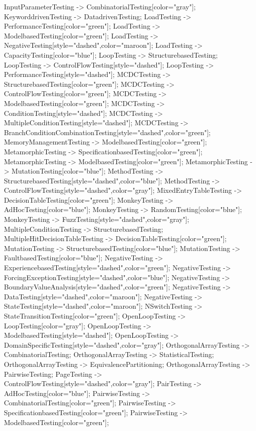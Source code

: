 \documentclass{article}
\begin{document}
{InputParameterTesting -> CombinatorialTesting[color="gray"];
KeyworddrivenTesting -> DatadrivenTesting;
LoadTesting -> PerformanceTesting[color="green"];
LoadTesting -> ModelbasedTesting[color="green"];
LoadTesting -> NegativeTesting[style="dashed",color="maroon"];
LoadTesting -> CapacityTesting[color="blue"];
LoopTesting -> StructurebasedTesting;
LoopTesting -> ControlFlowTesting[style="dashed"];
LoopTesting -> PerformanceTesting[style="dashed"];
MCDCTesting -> StructurebasedTesting[color="green"];
MCDCTesting -> ControlFlowTesting[color="green"];
MCDCTesting -> ModelbasedTesting[color="green"];
MCDCTesting -> ConditionTesting[style="dashed"];
MCDCTesting -> MultipleConditionTesting[style="dashed"];
MCDCTesting -> BranchConditionCombinationTesting[style="dashed",color="green"];
MemoryManagementTesting -> ModelbasedTesting[color="green"];
MetamorphicTesting -> SpecificationbasedTesting[color="green"];
MetamorphicTesting -> ModelbasedTesting[color="green"];
MetamorphicTesting -> MutationTesting[color="blue"];
MethodTesting -> StructurebasedTesting[style="dashed",color="blue"];
MethodTesting -> ControlFlowTesting[style="dashed",color="gray"];
MixedEntryTableTesting -> DecisionTableTesting[color="green"];
MonkeyTesting -> AdHocTesting[color="blue"];
MonkeyTesting -> RandomTesting[color="blue"];
MonkeyTesting -> FuzzTesting[style="dashed",color="gray"];
MultipleConditionTesting -> StructurebasedTesting;
MultipleHitDecisionTableTesting -> DecisionTableTesting[color="green"];
MutationTesting -> StructurebasedTesting[color="blue"];
MutationTesting -> FaultbasedTesting[color="blue"];
NegativeTesting -> ExperiencebasedTesting[style="dashed",color="green"];
NegativeTesting -> ForcingExceptionTesting[style="dashed",color="blue"];
NegativeTesting -> BoundaryValueAnalysis[style="dashed",color="green"];
NegativeTesting -> DataTesting[style="dashed",color="maroon"];
NegativeTesting -> StateTesting[style="dashed",color="maroon"];
NSwitchTesting -> StateTransitionTesting[color="green"];
OpenLoopTesting -> LoopTesting[color="gray"];
OpenLoopTesting -> ModelbasedTesting[style="dashed"];
OpenLoopTesting -> DomainSpecificTesting[style="dashed",color="gray"];
OrthogonalArrayTesting -> CombinatorialTesting;
OrthogonalArrayTesting -> StatisticalTesting;
OrthogonalArrayTesting -> EquivalencePartitioning;
OrthogonalArrayTesting -> PairwiseTesting;
PageTesting -> ControlFlowTesting[style="dashed",color="gray"];
PairTesting -> AdHocTesting[color="blue"];
PairwiseTesting -> CombinatorialTesting[color="green"];
PairwiseTesting -> SpecificationbasedTesting[color="green"];
PairwiseTesting -> ModelbasedTesting[color="green"];
}
\end{document}
